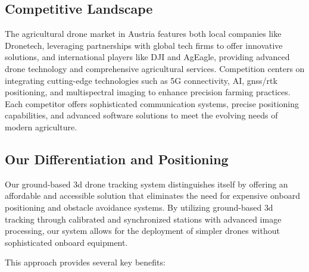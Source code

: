 \subsection{Competitive Landscape}

The agricultural drone market in Austria features both local companies like Dronetech, leveraging partnerships with global tech firms to offer innovative solutions, and international players like DJI and AgEagle, providing advanced drone technology and comprehensive agricultural services. Competition centers on integrating cutting-edge technologies such as 5G connectivity, AI, \acrshort{gnss}/\acrshort{rtk} positioning, and multispectral imaging to enhance precision farming practices. Each competitor offers sophisticated communication systems, precise positioning capabilities, and advanced software solutions to meet the evolving needs of modern agriculture.

\subsection{Our Differentiation and Positioning}

Our ground-based \acrshort{3d} drone tracking system distinguishes itself by offering an affordable and accessible solution that eliminates the need for expensive onboard positioning and obstacle avoidance systems. By utilizing ground-based \acrshort{3d} tracking through calibrated and synchronized stations with advanced image processing, our system allows for the deployment of simpler drones without sophisticated onboard equipment.

This approach provides several key benefits:

